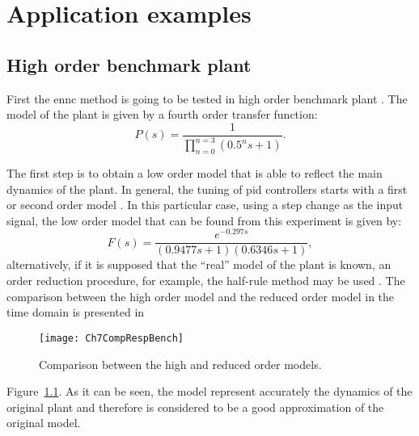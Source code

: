 \chapter{Application examples}
\label{chap:ApplicationExamples}
%
%
\section{High order benchmark plant}
\label{sec:Bechmark}
First the \gls{ennc} method is going to be tested in high order benchmark plant \citep{Astroem2000}. The model of the plant is given by a fourth order transfer function:
\begin{equation}
P(s) = \frac{1}{\prod_{n=0}^{n=3}(0.5^n s+1)}.
\label{eq:benchmarkTF}
\end{equation}

The first step is to obtain a low order model that is able to reflect the main dynamics of the plant. In general, the tuning of \gls{pid} controllers starts with a first or second order model \citep{Alfaro2006}. In this particular case, using a step change as the input signal, the low order model that can be found from this experiment is given by:
%
\begin{equation}
F(s)=\frac{e^{-0.297s}}{(0.9477s+1)(0.6346s+1)},
\label{eq:BenchTFfit}
\end{equation}
%
alternatively, if it is supposed that the ``real'' model of the plant is known, an order reduction procedure, for example, the half-rule method may be used \citep{Skogestad2003}. The comparison between the high order model and the reduced order model in the time domain is presented in %
\begin{figure}[tb]
	\centering
	\texttt{[image: Ch7CompRespBench]}
	\caption{Comparison between the high and reduced order models.}
	\label{fig:Ch7CompRespBench}
\end{figure}
%
Figure~\ref{fig:Ch7CompRespBench}. As it can be seen, the model represent accurately the dynamics of the original plant and therefore is considered to be a good approximation of the original model.

